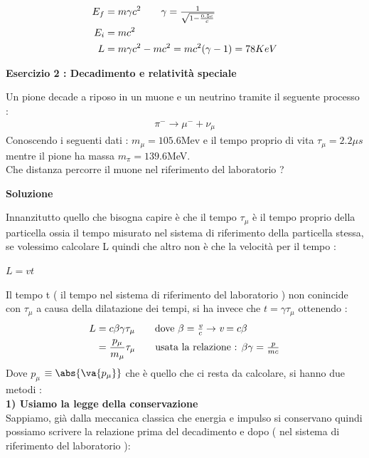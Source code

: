 \documentclass[a4paper, 12pt, twoside]{report}
\begin{document}
\begin{align*}
        E_{f} &= m\gamma c^2 \tag*{$\gamma = \frac{1}{\sqrt{1-\frac{0.5c}{c}}}$}\\
        E_{i} &= mc^2\\
        L &= m\gamma c^2 - mc^2 = mc^2(\gamma - 1) = 78 KeV
\end{align*}
\begin{center}{\textbf{Esercizio 2 : Decadimento e relatività speciale}}\end{center}
Un pione decade a riposo in un muone e un neutrino tramite il seguente processo : 
\begin{align*}
    \pi^{-} \rightarrow \mu^{-} + \nu_{\mu}
\end{align*}
Conoscendo i seguenti dati : $m_{\mu} = 105.6$Mev e il tempo proprio di vita $\tau_{\mu} = 2.2\mu s$ mentre il 
pione ha massa $m_{\pi} = 139.6$MeV.\\ 
Che distanza percorre il muone nel riferimento del laboratorio ? \\
\begin{center}{\textbf{Soluzione}}\end{center}
Innanzitutto quello che bisogna capire è che il tempo $\tau_{\mu}$ è il tempo proprio della particella ossia il tempo 
misurato nel sistema di riferimento della particella stessa, se volessimo calcolare L quindi che altro non è che la 
velocità per il tempo :\\
\begin{center} $L = \textit{v}t$\end{center}
Il tempo t ( il tempo nel sistema di riferimento del laboratorio ) non conincide con $\tau_{\mu}$ a causa della dilatazione dei tempi, 
si ha invece che $t=\gamma\tau_{\mu}$ ottenendo : 
\begin{align*}
        L &= c\beta\gamma\tau_{\mu}  \tag*{dove $\beta = \frac{\textit{v}}{c} \rightarrow \textit{v} = c\beta$} \\
          &= \frac{\textit{$p_{\mu}$}}{m_{\mu}}\tau_{\mu} \tag*{usata la relazione : $\beta\gamma = \frac{\textit{p}}{mc}$}
\end{align*}
Dove \textit{$p_{\mu}$} $\equiv \abs{\va{p_{\mu}}}$ che è quello che ci resta da calcolare, si hanno due metodi : \\
\textbf{1) Usiamo la legge della conservazione} \\
Sappiamo, già dalla meccanica classica che energia e impulso si conservano quindi possiamo scrivere la relazione prima del decadimento
e dopo ( nel sistema di riferimento del laboratorio ): 
\end{document}
